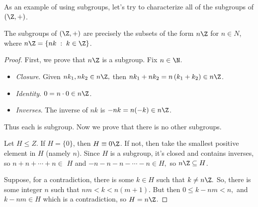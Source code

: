 \documentclass[a4paper]{scrartcl}
\begin{document}
As an example of using subgroups, let's try to characterize all of the subgroups of $(\Z, +)$.

\begin{theorem}[Subgroups of $\Z$]\label{thm:subgroups-of-z}
	The subgroups of $(\Z, +)$ are precisely the subsets of the form $n \Z$ for $n \in N$, where $n\Z = \{n k \; : \; k \in \Z\}$.
\end{theorem}
\begin{proof}
	First, we prove that $n \Z$ is a subgroup. Fix $n \in \N$.
	\begin{itemize}
		\item \emph{Closure}. Given $n k_{1}, n k_{2} \in n \Z,$ then $n k_{1}+n k_{2}=n\left(k_{1}+k_{2}\right) \in n \Z$.
		\item \emph{Identity}. $0 =n \cdot 0 \in n \Z$.
		\item \emph{Inverses}. The inverse of $n k$ is $-n k=n(-k) \in n \Z$.
	\end{itemize}
Thus each is subgroup. Now we prove that there is no other subgroups.

Let $H \leq Z$. If $H=\{0\}$, then $H \equiv 0 \Z$. If not, then take the smallest positive element in $H$ (namely $n$). Since $H$ is a subgroup, it's closed and contains inverses, so $n+n+\cdots+n \in$ $H$ and $-n-n-n-\cdots-n \in H,$ so $n \Z \subseteq H$.

Suppose, for a contradiction, there is some $k \in H$ such that $k \neq n \Z .$ So, there is some integer $n$ such that $n m<k<n(m+1) .$ But then $0 \leq k-n m<n,$ and $k-n m \in H$ which is a contradiction, so $H=n \Z$.
\end{proof}
\end{document}
